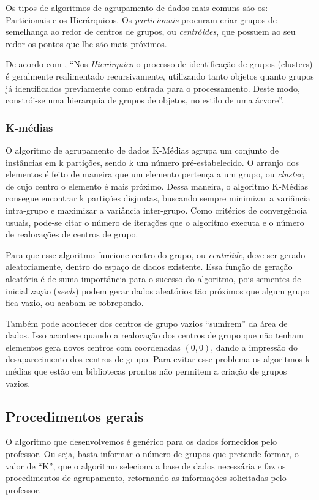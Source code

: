 \documentclass[12pt, a4paper]{article}
\begin{document}
Os tipos de algoritmos de agrupamento de dados mais comuns são os: Particionais e os Hierárquicos. Os \emph{particionais} procuram criar grupos de semelhança ao redor de centros de grupos, ou \emph{centróides}, que possuem ao seu redor os pontos que lhe são mais próximos.

De acordo com \citep{hierarquico}, ``Nos \emph{Hierárquico} o processo de identificação de grupos (clusters) é geralmente realimentado recursivamente, utilizando tanto objetos quanto grupos já identificados previamente como entrada para o processamento. Deste modo, constrói-se uma hierarquia de grupos de objetos, no estilo de uma árvore''.

\subsubsection{K-médias}
O algoritmo de agrupamento de dados K-Médias agrupa um conjunto de instâncias
em k partições, sendo k um número pré-estabelecido. O arranjo dos elementos é feito de maneira
que um elemento pertença a um grupo, ou \emph{cluster}, de cujo centro o elemento é mais próximo.
Dessa maneira, o algoritmo K-Médias consegue encontrar k partições disjuntas, buscando sempre
minimizar a variância intra-grupo e maximizar a variância inter-grupo. Como critérios de
convergência usuais, pode-se citar o número de iterações que o algoritmo executa e o número de
realocações de centros de grupo.

Para que esse algoritmo funcione centro do grupo, ou \textit{centróide},  deve ser gerado aleatoriamente, dentro do espaço de dados existente. Essa função de geração aleatória é de suma importância para o sucesso do algoritmo, pois sementes de inicialização (\emph{seeds}) podem gerar dados aleatórios tão próximos que algum grupo fica vazio, ou acabam se sobrepondo.

Também pode acontecer dos centros de grupo vazios ``sumirem'' da área de dados. Isso acontece quando a realocação dos centros de grupo que não tenham elementos gera novos centros com coordenadas $(0, 0)$, dando a impressão do desaparecimento dos centros de grupo. Para evitar esse problema os algoritmos k-médias que estão em bibliotecas prontas não permitem a criação de grupos vazios.

\subsection{Procedimentos gerais}
O algoritmo que desenvolvemos é genérico para os dados fornecidos pelo professor. Ou seja, basta informar o número de grupos que pretende formar, o valor de ``K'', que o algoritmo seleciona a base de dados necessária e faz os procedimentos de agrupamento, retornando as informações solicitadas pelo professor.
\end{document}
